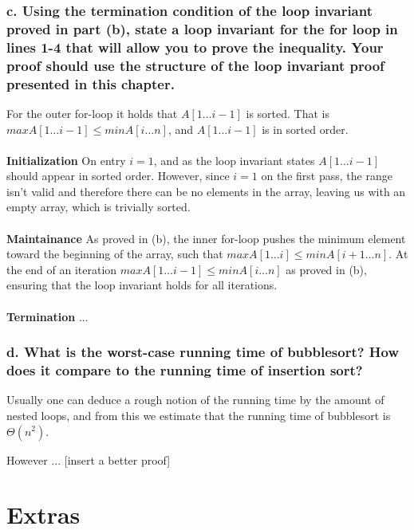 \documentclass[11pt,english]{article}
\begin{document}
\subsubsection*{c. \mdseries Using the termination condition of the loop
invariant proved in part (b), state a loop invariant for the \textbf{for} loop
in lines 1-4 that will allow you to prove the inequality. Your proof should
use the structure of the loop invariant proof presented in this chapter.}
For the outer for-loop it holds that $A[1 \dots i-1]$ is sorted. That is
$max{A[1 \dots i - 1]} \leq min{A[i \dots n]}$, and $A[1 \dots i-1]$ is
in sorted order.
\\\\
\textbf{Initialization} \mdseries On entry $i = 1$, and as the loop invariant
states $A[1 \dots i - 1]$ should appear in sorted order. However, since
$i = 1$ on the first pass, the range isn't valid and therefore there can be
no elements in the array, leaving us with an empty array, which is trivially
sorted.
\\\\
\textbf{Maintainance} \mdseries As proved in (b), the inner for-loop pushes
the minimum element toward the beginning of the array, such that
$max{A[1 \dots i]} \leq min{A[i + 1 \dots n]}$. At the end of an iteration
$max{A[1 \dots i - 1]} \leq min{A[i \dots n]}$ as proved in (b), ensuring that
the loop invariant holds for all iterations.
\\\\
\textbf{Termination} \mdseries ...


\subsubsection*{d. \mdseries What is the worst-case running time of
bubblesort? How does it compare to the running time of insertion sort?}
Usually one can deduce a rough notion of the running time by the amount of
nested loops, and from this we estimate that the running time of bubblesort
is $\Theta(n^2)$.

However ... [insert a better proof]






\newpage
\section*{Extras}
\end{document}
